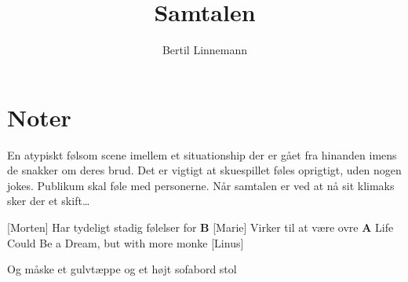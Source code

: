 \documentclass{article}
\title{Samtalen}
\author{Bertil Linnemann}
\newcommand{\AV}{{\color{red}\sf A\negthinspace V}}
\newcommand{\rA}{{\color{disc1}\textbf{A}}}
\newcommand{\rB}{{\color{disc2}\textbf{B}}}
\begin{document}
                
\maketitle
\section*{Noter}                %
En atypiskt følsom scene imellem et situationship der er gået fra hinanden imens
de snakker om deres brud. Det er vigtigt at skuespillet føles oprigtigt, uden
nogen jokes. Publikum skal føle med personerne. Når samtalen er ved at nå sit
klimaks sker der et skift\dots

\begin{roles}
\role{\rA{}} [Morten] Har tydeligt stadig følelser for \rB
\role{\rB{}} [Marie] Virker til at være ovre \rA
\role{\AV{}} Life Could Be a Dream, but with more monke
[Linus]
\end{roles}

\begin{props}
     Og måske et gulvtæppe og et højt sofabord stol

\end{props}
\end{document}
